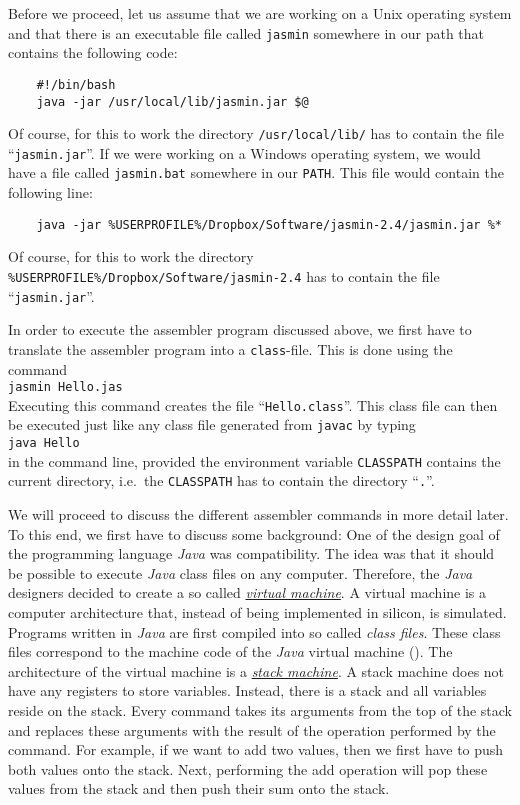 Before we proceed, let us assume that we are working on a Unix operating system and that there is an
executable file called \texttt{jasmin} somewhere in our path that contains the following code:
\begin{verbatim}
    #!/bin/bash 
    java -jar /usr/local/lib/jasmin.jar $@
\end{verbatim}
Of course, for this to work the directory \texttt{/usr/local/lib/} has to contain the file
``\texttt{jasmin.jar}''.  If we were working on a Windows operating system, we would have a file
called \texttt{jasmin.bat} somewhere in our \texttt{PATH}.  This file would contain the following
line:
\begin{verbatim}
    java -jar %USERPROFILE%/Dropbox/Software/jasmin-2.4/jasmin.jar %*
\end{verbatim}
Of course, for this to work the directory \texttt{\%USERPROFILE\%/Dropbox/Software/jasmin-2.4}
has to contain the file ``\texttt{jasmin.jar}''.

In order to execute the assembler program discussed above, we first have to translate the assembler
program into a \texttt{class}-file.  This is done using the command
\\[0.2cm]
\hspace*{1.3cm}
\texttt{jasmin Hello.jas}
\\[0.2cm]
Executing this command creates the file ``\texttt{Hello.class}''.  This class file
can then be executed just like any class file generated from \texttt{javac} by typing
\\[0.2cm]
\hspace*{1.3cm}
\texttt{java Hello}
\\[0.2cm]
in the command line, provided the environment variable \texttt{CLASSPATH} contains the current
directory, i.e.~the \texttt{CLASSPATH} has to contain the directory ``\texttt{.}''.

We will proceed to discuss the different assembler commands in more detail later.  To this end, we
first have to discuss some background: One of the design goal of the programming language
\textsl{Java} was compatibility.  The idea was 
that it should be possible to execute \textsl{Java} class files on any computer.  Therefore, the
\textsl{Java} designers decided to create a so called 
\href{http://en.wikipedia.org/wiki/Virtual_machine}{\emph{virtual machine}}.  A virtual machine is
a computer architecture that, instead of being implemented in silicon, is simulated. 
Programs written in \textsl{Java} are first compiled into so called \emph{class files}.  These class
files correspond to the machine code of the \textsl{Java} virtual machine ().  
The architecture of the virtual machine is a 
\href{http://en.wikipedia.org/wiki/Stack_machine}{\emph{stack machine}}. 
A stack machine does not have any registers to store variables.  Instead, there is a stack and all
variables reside on the stack.  Every command takes its arguments from the top of the stack and
replaces these arguments with the result of the operation performed by the command.
For example, if we want to add two values, then we first have to
push both values onto the stack.  Next, performing the add operation will pop these values from the
stack and then push their sum onto the stack.



